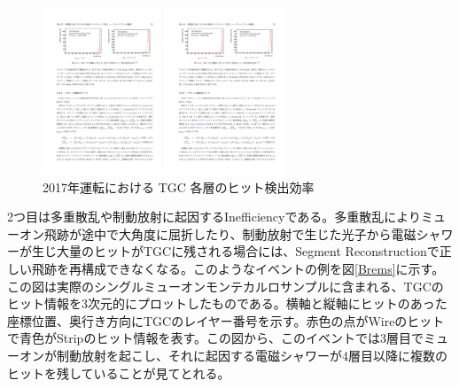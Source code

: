 \begin{figure}
\begin{minipage}[b]{.5\linewidth}
\centering
\includegraphics[height=5cm]{fig/Test/tgchit_wire.pdf}
\end{minipage}%
\begin{minipage}[b]{.5\linewidth}
\centering
\includegraphics[height=5cm]{fig/Test/tgchit_strip.pdf}
\end{minipage}%
\caption[2017年運転における TGC 各層のヒット検出効率]{2017年運転における TGC 各層のヒット検出効率\cite{mt_kawaguchi}}
\label{tgchit_efficiency}
\end{figure}

2つ目は多重散乱や制動放射に起因するInefficiencyである。多重散乱によりミューオン飛跡が途中で大角度に屈折したり、制動放射で生じた光子から電磁シャワーが生じ大量のヒットがTGCに残される場合には、Segment Reconstructionで正しい飛跡を再構成できなくなる。このようなイベントの例を図\ref{Brems}に示す。この図は実際のシングルミューオンモンテカルロサンプルに含まれる、TGCのヒット情報を3次元的にプロットしたものである。横軸と縦軸にヒットのあった座標位置、奥行き方向にTGCのレイヤー番号を示す。赤色の点がWireのヒットで青色がStripのヒット情報を表す。この図から、このイベントでは3層目でミューオンが制動放射を起こし、それに起因する電磁シャワーが4層目以降に複数のヒットを残していることが見てとれる。

